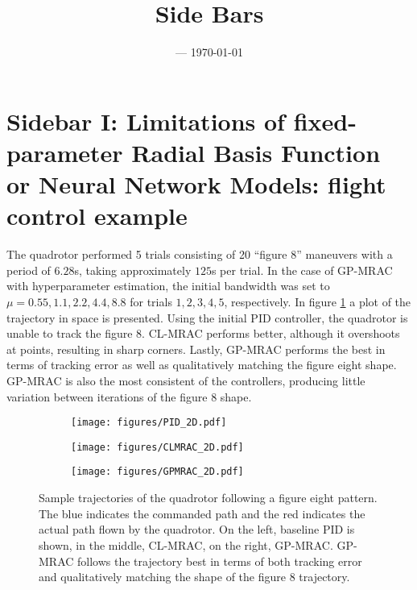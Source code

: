 \documentclass[letterpaper,12pt,peerreviewca,draftcls]{IEEEtran}
\title{Side Bars\\
{\Large }
}
\author{  --- \today}
\begin{document}
\maketitle
\CSMsetup

\setcounter{equation}{0} 
\renewcommand{\theequation}{S\arabic{equation}} 
\setcounter{table}{0} 
\renewcommand{\thetable}{S\arabic{table}} 
\setcounter{figure}{0} 
\renewcommand{\thefigure}{S\arabic{figure}}

\section{Sidebar I: Limitations of fixed-parameter Radial Basis Function or Neural Network Models: flight control example}
The quadrotor performed 5 trials consisting of 20 ``figure 8'' maneuvers with a period of $6.28$s, taking approximately $125$s per trial. In the case of GP-MRAC with hyperparameter estimation, the initial bandwidth was set to $\mu = 0.55, 1.1, 2.2, 4.4, 8.8$ for trials $1,2,3,4,5$, respectively.
In figure \ref{fig:fig8_2D} a plot of the trajectory in space is presented. Using the initial PID controller, the quadrotor is unable to track the figure 8. CL-MRAC performs better, although it overshoots at points, resulting in sharp corners. Lastly, GP-MRAC performs the best in terms of tracking error as well as qualitatively matching the figure eight shape. GP-MRAC is also the most consistent of the controllers, producing little variation between iterations of the figure 8 shape.

\begin{figure}[H]
\centering
\begin{subfigure}
\centering
\texttt{[image: figures/PID\_2D.pdf]}
\end{subfigure} 
\begin{subfigure}
\centering
\texttt{[image: figures/CLMRAC\_2D.pdf]}
\end{subfigure} 
\begin{subfigure}
\centering
\texttt{[image: figures/GPMRAC\_2D.pdf]}
\end{subfigure}
\caption{Sample trajectories of the quadrotor following a figure eight pattern. The blue indicates the commanded path and the red indicates the actual path flown by the quadrotor. On the left, baseline PID is shown, in the middle, CL-MRAC, on the right, GP-MRAC. GP-MRAC follows the trajectory best in terms of both tracking error and qualitatively matching the shape of the figure 8 trajectory.}
\label{fig:fig8_2D}
\end{figure}
\end{document}
